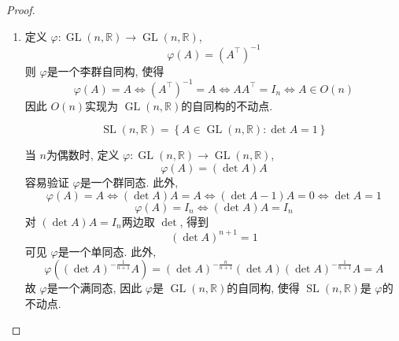 \documentclass[../main.tex]{subfiles}
\begin{document}
\begin{proof}
\begin{enumerate}
\[ \exp \left( tX \right)=    \varphi \left( \exp \left( tX \right)  \right)= \exp \left(  \varphi _{*}\left( tX \right)  \right) = \exp \left( t \varphi _{*}\left( X \right)  \right) 
  \]两边求 \(  t= 0  \)处的切向量, 得到  \[
  X=  \varphi _{*}\left( X \right) 
  \]故 \[
  \mathfrak{h}\subseteq \left\{ X \in \mathfrak{g}:  \varphi _{*}\left( X \right)= X  \right\}
  \]记 \(  \mathfrak{h}^{\prime} = \left\{ X \in \mathfrak{g}: \varphi _{*}\left( X \right)= X  \right\}  \), 容易验证 \(  \mathfrak{h}  ^{\prime} \)是一个李代数.   任取 \(  X  \in \mathfrak{h}^{\prime}   \), 由 \(  \exp   \)的自然性     \[
 \exp \left(t X \right)= \exp \left(  \varphi _{*}\left(tX \right)  \right)=   \varphi \left( \exp \left(tX \right)  \right)   
  \] 这表明 \[
  \exp \left( tX \right)\in  H,\quad \forall t\in \mathbb{R} , h\in \mathfrak{h}^{\prime}  
  \]因此 \(  X \in \mathfrak{h}  \).  \(  \mathfrak{h}^{\prime} \subseteq \mathfrak{h}  \).  故 \[
  \mathfrak{h}= \left\{ X \in \mathfrak{g}:  \varphi _{*}\left( X \right)= X  \right\}
  \]  
  \item 定义 \(   \varphi :\operatorname{GL} \left( n,\mathbb{R}  \right)\to \operatorname{GL} \left( n,\mathbb{R}  \right)    \), \[
   \varphi \left( A \right)= \left( A^{\top} \right)^{-1}   
  \] 则 \(   \varphi   \)是一个李群自同构, 使得 \[
   \varphi \left( A \right)= A\iff  \left( A^{\top} \right)^{-1} = A\iff  A A^{\top}= I_{n}\iff A\in O\left( n \right)   
  \] 因此 \(  O\left( n \right)   \)实现为 \(  \operatorname{GL} \left( n,\mathbb{R}  \right)   \)的自同构的不动点.  

  \[
  \operatorname{SL}\left( n,\mathbb{R}  \right)= \left\{ A\in \operatorname{GL} \left( n,\mathbb{R}  \right): \det A= 1  \right\} 
  \]
  
   当 \(  n  \)为偶数时, 定义 \(   \varphi : \operatorname{GL} \left( n,\mathbb{R}  \right)\to \operatorname{GL} \left( n,\mathbb{R}  \right)    \), \[
   \varphi \left( A \right)= \left( \det A \right)A  
  \] 容易验证 \(   \varphi   \)是一个群同态. 此外,  \[
   \varphi \left( A \right)= A\iff \left( \det A \right)A= A\iff \left( \det A-1 \right)A= 0 \iff \det A= 1
  \]     \[
   \varphi \left( A \right)= I_{n}\iff \left( \det A \right)A= I_{n} 
  \]对 \( \left( \det A \right)A= I_{n}   \)两边取 \(  \det   \), 得到 \[
  \left( \det A \right)^{n+ 1}= 1 
  \]   可见 \(   \varphi   \)是一个单同态. 此外,  \[
 \varphi  \left( \left( \det A \right)^{-\frac{1}{n+ 1}}  A\right)= \left( \det A \right)^{-\frac{n }{n+ 1 } }\left( \det A \right)  \left( \det A \right)^{-\frac{1}{n+ 1}}A= A    
  \]   故 \(   \varphi   \)是一个满同态, 因此 \(   \varphi   \)是 \(  \operatorname{GL} \left( n,\mathbb{R}  \right)   \)的自同构, 使得 \(  \operatorname{SL}\left( n,\mathbb{R}  \right)   \)是 \(   \varphi   \)的不动点.
  

\end{enumerate}
\end{proof}
\end{document}

